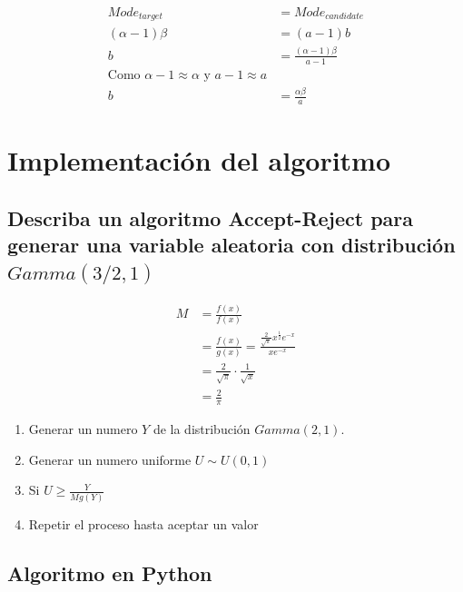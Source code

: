 \documentclass{article}
\begin{document}
\[
	\begin{split}
		Mode_{target}     & = Mode_{candidate}                    \\
		(\alpha - 1)\beta & = (a - 1)b                            \\
		b                 & = \frac{(\alpha - 1)\beta}{a-1}       \\
		\text{Como $\alpha -1 \approx \alpha $ y $a-1 \approx a$} \\
		b                 & = \frac{\alpha \beta}{a}
	\end{split}
\]

\section{Implementación del algoritmo}

\subsection{Describa un algoritmo \textbf{Accept-Reject} para generar una variable aleatoria con distribución $Gamma(3/2,1)$}

\[
	\begin{split}
		M & = \frac{f(x)}{f(x)}                                                                \\
		  & = \frac{f(x)}{g(x)} = \frac{\frac{2}{\sqrt{\pi}} x^{\frac{1}{2}} e^{-x}}{x e^{-x}} \\
		  & = \frac{2}{\sqrt{\pi}} \cdot \frac{1}{\sqrt{x}}                                    \\
		  & = \frac{2}{\pi}
	\end{split}
\]


\begin{enumerate}
	\item Generar un numero $Y$ de la distribución $Gamma(2,1)$.
	\item Generar un numero uniforme $U \sim U(0,1)$
	\item Si $U \ge \frac{Y}{M g(Y)}$
	\item Repetir el proceso hasta aceptar un valor
\end{enumerate}


\subsection{Algoritmo en Python}
\begin{pythonbox}
	\inputminted{python}{code/accept.py}
\end{pythonbox}
\end{document}
